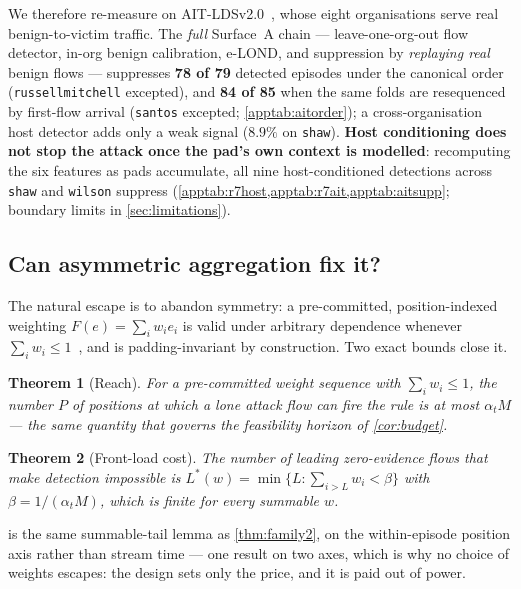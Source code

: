 \documentclass[conference]{IEEEtran}
\newtheorem{theorem}{Theorem}
\newcommand{\ceil}{M}
\newcommand{\alphat}{\alpha_t}
\begin{document}
We therefore re-measure on AIT-LDSv2.0~\cite{aitlds}, whose eight organisations serve real
benign-to-victim traffic. The \emph{full} Surface~A chain --- leave-one-org-out flow detector, in-org
benign calibration, e-LOND, and suppression by \emph{replaying real} benign flows --- suppresses
\textbf{78 of 79} detected episodes under the canonical order (\texttt{russellmitchell} excepted), and
\textbf{84 of 85} when the same folds are resequenced by first-flow arrival (\texttt{santos} excepted;
\cref{apptab:aitorder}); a cross-organisation host detector adds only a weak signal ($8.9\%$ on
\texttt{shaw}). \textbf{Host conditioning does not stop the attack
once the pad's own context is modelled}: recomputing the six features as pads accumulate, all nine
host-conditioned detections across \texttt{shaw} and \texttt{wilson} suppress
(\cref{apptab:r7host,apptab:r7ait,apptab:aitsupp}; boundary limits in \cref{sec:limitations}).

\subsection{Can asymmetric aggregation fix it?}\label{sec:asymmetric}

The natural escape is to abandon symmetry: a
pre-committed, position-indexed weighting $F(e) = \sum_i w_i e_i$ is valid under arbitrary
dependence whenever $\sum_i w_i \le 1$~\cite{wang2025admissible}, and is padding-invariant by
construction. Two exact bounds close it.

\begin{theorem}[Reach]\label{thm:reach}
For a pre-committed weight sequence with $\sum_i w_i \le 1$, the number $P$ of positions at which a
lone attack flow can fire the rule is \emph{at most} $\alphat \ceil$ --- the same quantity that governs
the feasibility horizon of \cref{cor:budget}.
\end{theorem}

\begin{theorem}[Front-load cost]\label{thm:frontload}
The number of leading zero-evidence flows that make detection impossible is
$L^{*}(w) = \min\{L : \sum_{i>L} w_i < \beta\}$ with $\beta = 1/(\alphat \ceil)$, which is
\emph{finite for every summable $w$}.
\end{theorem}

 is the same summable-tail lemma as \cref{thm:family2}, on the
within-episode position axis rather than stream time --- one result on two axes, which is why no
choice of weights escapes: the design sets only the price, and it is paid out of power.
\end{document}
